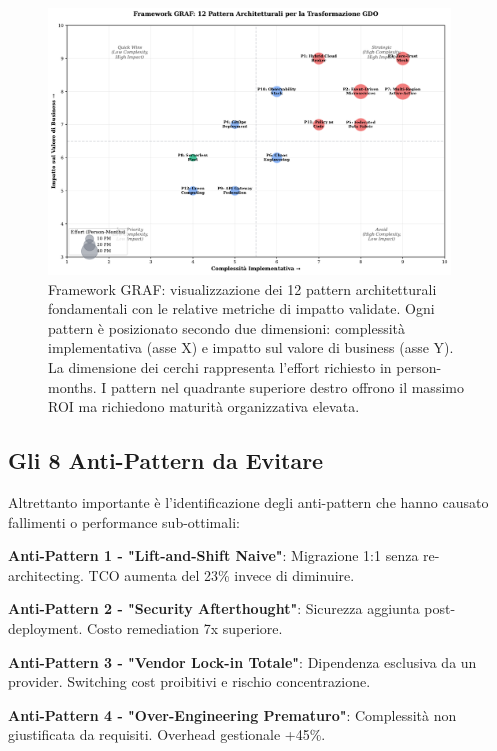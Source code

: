 \begin{figure}[htbp]
\centering
\includegraphics[width=0.95\textwidth]{thesis_figures/cap3/graf_framework_patterns.pdf}
\caption[Framework GRAF con i 12 pattern architetturali e metriche di impatto]{Framework GRAF: visualizzazione dei 12 pattern architetturali fondamentali con le relative metriche di impatto validate. Ogni pattern è posizionato secondo due dimensioni: complessità implementativa (asse X) e impatto sul valore di business (asse Y). La dimensione dei cerchi rappresenta l'effort richiesto in person-months. I pattern nel quadrante superiore destro offrono il massimo ROI ma richiedono maturità organizzativa elevata.}
\label{fig:graf_patterns}
\end{figure}

\subsection{\texorpdfstring{Gli 8 Anti-Pattern da Evitare}{3.2.3 - Gli 8 Anti-Pattern da Evitare}}

Altrettanto importante è l'identificazione degli anti-pattern che hanno causato fallimenti o performance sub-ottimali:

\textbf{Anti-Pattern 1 - "Lift-and-Shift Naive"}: Migrazione 1:1 senza re-architecting. TCO aumenta del 23\% invece di diminuire.

\textbf{Anti-Pattern 2 - "Security Afterthought"}: Sicurezza aggiunta post-deployment. Costo remediation 7x superiore.

\textbf{Anti-Pattern 3 - "Vendor Lock-in Totale"}: Dipendenza esclusiva da un provider. Switching cost proibitivi e rischio concentrazione.

\textbf{Anti-Pattern 4 - "Over-Engineering Prematuro"}: Complessità non giustificata da requisiti. Overhead gestionale +45\%.

